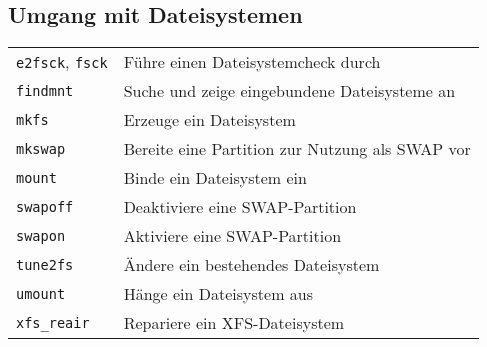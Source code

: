 \documentclass[10pt,a4paper]{article}
\begin{document}
\begin{multicols}{2} 
\section{Umgang mit Dateisystemen}
\begin{tabular}{ p{2.5cm} p{8.5cm} }
  \hline
  \texttt{e2fsck}, \texttt{fsck} & Führe einen Dateisystemcheck durch \\
  \texttt{findmnt} & Suche und zeige eingebundene Dateisysteme an \\
  \texttt{mkfs} & Erzeuge ein Dateisystem \\
  \texttt{mkswap} & Bereite eine Partition zur Nutzung als SWAP vor \\
  \texttt{mount} & Binde ein Dateisystem ein \\
  \texttt{swapoff} & Deaktiviere eine SWAP-Partition \\
  \texttt{swapon} & Aktiviere eine SWAP-Partition \\
  \texttt{tune2fs} & Ändere ein bestehendes Dateisystem \\
  \texttt{umount} & Hänge ein Dateisystem aus \\
  \texttt{xfs\_reair} & Repariere ein XFS-Dateisystem\\
  \hline
\end{tabular}



\end{multicols}
\end{document}
